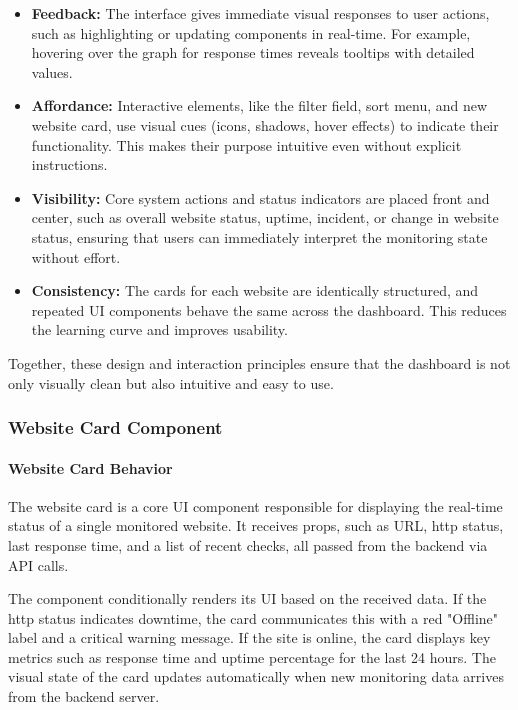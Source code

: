 \begin{itemize}
    \item \textbf{Feedback:} The interface gives immediate visual responses to user actions, such as highlighting or updating components in real-time. For example, hovering over the graph for response times reveals tooltips with detailed values.
    \item \textbf{Affordance:} Interactive elements, like the filter field, sort menu, and new website card, use visual cues (icons, shadows, hover effects) to indicate their functionality. This makes their purpose intuitive even without explicit instructions.
    \item \textbf{Visibility:} Core system actions and status indicators are placed front and center, such as overall website status, uptime, incident, or change in website status, ensuring that users can immediately interpret the monitoring state without effort.
    \item \textbf{Consistency:} The cards for each website are identically structured, and repeated UI components behave the same across the dashboard. This reduces the learning curve and improves usability.
\end{itemize}

Together, these design and interaction principles ensure that the dashboard is not only visually clean but also intuitive and easy to use.
    

\subsubsection{Website Card Component}
\label{subsubsec:website_card}

\paragraph{Website Card Behavior}

The website card is a core UI component responsible for displaying the real-time status of a single monitored website. It receives props, such as URL, \acrshort{http} status, last response time, and a list of recent checks, all passed from the backend via API calls.

The component conditionally renders its UI based on the received data.
If the \acrshort{http} status indicates downtime, the card communicates this with a red "Offline" label and a critical warning message. If the site is online, the card displays key metrics such as response time and uptime percentage for the last 24 hours. The visual state of the card updates automatically when new monitoring data arrives from the backend server.



